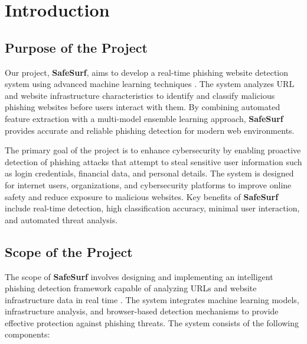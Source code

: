 \chapter{Introduction}

\section{Purpose of the Project}

Our project, \textbf{SafeSurf}, aims to develop a real-time phishing website detection system using advanced machine learning techniques \cite{ref1}. The system analyzes URL and website infrastructure characteristics to identify and classify malicious phishing websites before users interact with them. By combining automated feature extraction with a multi-model ensemble learning approach, \textbf{SafeSurf} provides accurate and reliable phishing detection for modern web environments.

The primary goal of the project is to enhance cybersecurity by enabling proactive detection of phishing attacks that attempt to steal sensitive user information such as login credentials, financial data, and personal details. The system is designed for internet users, organizations, and cybersecurity platforms to improve online safety and reduce exposure to malicious websites. Key benefits of \textbf{SafeSurf} include real-time detection, high classification accuracy, minimal user interaction, and automated threat analysis.

\section{Scope of the Project}

The scope of \textbf{SafeSurf} involves designing and implementing an intelligent phishing detection framework capable of analyzing URLs and website infrastructure data in real time \cite{ref2, ref3, ref4}. The system integrates machine learning models, infrastructure analysis, and browser-based detection mechanisms to provide effective protection against phishing threats.
The system consists of the following components:

